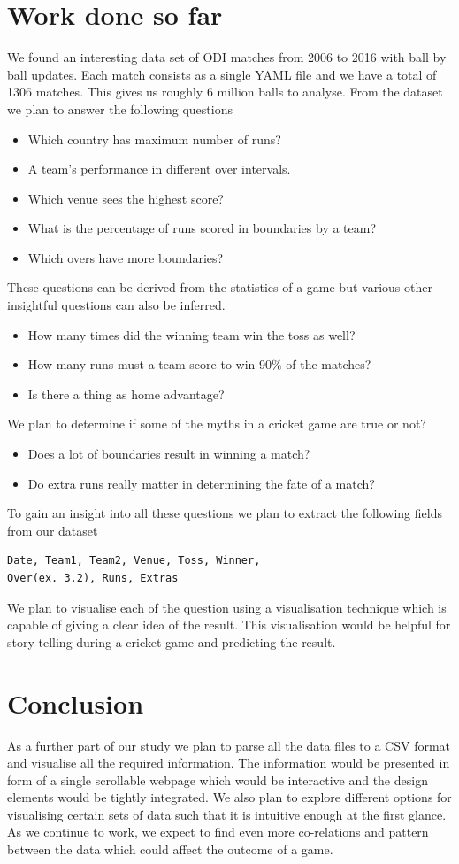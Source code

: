 \documentclass[10pt,journal,compsoc]{IEEEtran}
\begin{document}
\section{Work done so far}
We found an interesting data set of ODI matches from 2006 to 2016 with ball by ball updates. Each match consists as a single YAML file and we have a total of 1306 matches\cite{dataset}. This gives us roughly 6 million balls to analyse. From the dataset we plan to answer the following questions
\begin{itemize}
\item Which country has maximum number of runs?
\item A team's performance in different over intervals.
\item Which venue sees the highest score?
\item What is the percentage of runs scored in boundaries by a team?
\item Which overs have more boundaries?
\end{itemize}
These questions can be derived from the statistics of a game but various other insightful questions can also be inferred. 
\begin{itemize}
\item How many times did the winning team win the toss as well?
\item How many runs must a team score to win 90\% of the matches?
\item Is there a thing as home advantage?
\end{itemize}
We plan to determine if some of the myths in a cricket game are true or not?
\begin{itemize}
\item Does a lot of boundaries result in winning a match?
\item Do extra runs really matter in determining the fate of a match?
\end{itemize}
To gain an insight into all these questions we plan to extract the following fields from our dataset
\begin{verbatim}
Date, Team1, Team2, Venue, Toss, Winner, 
Over(ex. 3.2), Runs, Extras
\end{verbatim}
We plan to visualise each of the question using a visualisation technique which is capable of giving a clear idea of the result. This visualisation would be helpful for story telling during a cricket game and predicting the result.

\section{Conclusion}
As a further part of our study we plan to parse all the data files to a CSV format and visualise all the required information. The information would be presented in form of a single scrollable webpage which would be interactive and the design elements would be tightly integrated. We also plan to explore different options for visualising certain sets of data such that it is intuitive enough at the first glance. As we continue to work, we expect to find even more co-relations and pattern between the data which could affect the outcome of a game.
\end{document}
